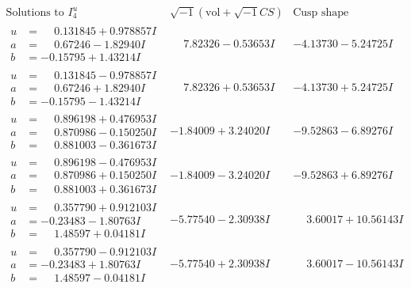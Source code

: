 \documentclass[1p]{elsarticle_modified}
\theoremstyle{definition}
\newcommand{\I}{\sqrt{-1}}
\begin{document}
$$\begin{array}{c|c|c}  
\text{Solutions to }I^u_{4}& \I (\text{vol} + \sqrt{-1}CS) & \text{Cusp shape}\\
 \hline 
\begin{aligned}
u &= \phantom{-}0.131845 + 0.978857 I \\
a &= \phantom{-}0.67246 - 1.82940 I \\
b &= -0.15795 + 1.43214 I\end{aligned}
 & \phantom{-}7.82326 - 0.53653 I & -4.13730 - 5.24725 I \\ \hline\begin{aligned}
u &= \phantom{-}0.131845 - 0.978857 I \\
a &= \phantom{-}0.67246 + 1.82940 I \\
b &= -0.15795 - 1.43214 I\end{aligned}
 & \phantom{-}7.82326 + 0.53653 I & -4.13730 + 5.24725 I \\ \hline\begin{aligned}
u &= \phantom{-}0.896198 + 0.476953 I \\
a &= \phantom{-}0.870986 - 0.150250 I \\
b &= \phantom{-}0.881003 - 0.361673 I\end{aligned}
 & -1.84009 + 3.24020 I & -9.52863 - 6.89276 I \\ \hline\begin{aligned}
u &= \phantom{-}0.896198 - 0.476953 I \\
a &= \phantom{-}0.870986 + 0.150250 I \\
b &= \phantom{-}0.881003 + 0.361673 I\end{aligned}
 & -1.84009 - 3.24020 I & -9.52863 + 6.89276 I \\ \hline\begin{aligned}
u &= \phantom{-}0.357790 + 0.912103 I \\
a &= -0.23483 - 1.80763 I \\
b &= \phantom{-}1.48597 + 0.04181 I\end{aligned}
 & -5.77540 - 2.30938 I & \phantom{-}3.60017 + 10.56143 I \\ \hline\begin{aligned}
u &= \phantom{-}0.357790 - 0.912103 I \\
a &= -0.23483 + 1.80763 I \\
b &= \phantom{-}1.48597 - 0.04181 I\end{aligned}
 & -5.77540 + 2.30938 I & \phantom{-}3.60017 - 10.56143 I \\ \hline\begin{aligned}

\end{aligned}
\end{array}$$
\end{document}
